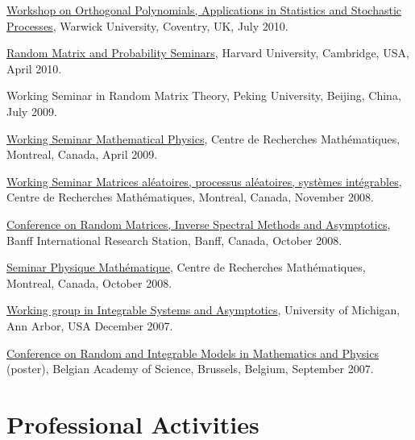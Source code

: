 \begin{item_list}
  \href{http://www2.warwick.ac.uk/fac/sci/statistics/crism/workshops/orthogonal-polynomials/}{Workshop on Orthogonal Polynomials, Applications in Statistics and Stochastic Processes}, Warwick University, Coventry, UK, July 2010.
\item
  \href{http://www.math.harvard.edu/cgi-bin/showtalk.pl}{Random Matrix and Probability Seminars}, Harvard University, Cambridge, USA, April 2010.
\item
  Working Seminar in Random Matrix Theory, Peking University, Beijing, China, July 2009.
\item
  \href{http://www.crm.umontreal.ca/cal/en/mois200804.html}{Working Seminar Mathematical Physics}, Centre de Recherches Math\'{e}matiques, Montreal, Canada, April 2009.
\item
  \href{http://www.crm.umontreal.ca/cal/en/mois200811.html}{Working Seminar Matrices al\'{e}atoires, processus al\'{e}atoires, syst\`{e}mes int\'{e}grables}, Centre de Recherches Math\'{e}matiques, Montreal, Canada, November 2008.
\item
  \href{http://www.birs.ca/events/2008/5-day-workshops/08w5017}{Conference on Random Matrices, Inverse Spectral Methods and Asymptotics}, Banff International Research Station, Banff, Canada, October 2008.
\item
  \href{http://www.crm.umontreal.ca/cal/en/mois200810.html}{Seminar Physique Math\'{e}matique}, Centre de Recherches Math\'{e}matiques, Montreal, Canada, October 2008.
\item
  \href{http://www.math.lsa.umich.edu/~millerpd/WGISA_archives/WGISA_Fall_07.html}{Working group in Integrable Systems and Asymptotics}, University of Michigan, Ann Arbor, USA December 2007.
\item
  \href{http://magelhaes.hzs.be/RIMMP/}{Conference on Random and Integrable Models in Mathematics and Physics} (poster), Belgian Academy of Science, Brussels, Belgium, September 2007.
\end{item_list}

\section*{Professional Activities }

